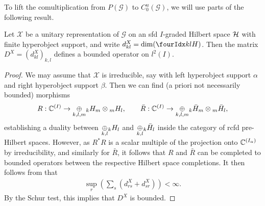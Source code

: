 To lift the comultiplication from $P(\mathscr{G})$ to
$C^{u}_{0}(\mathscr{G})$, we will use parts of the following result.


 \begin{Lem} \label{LemBoundDim} Let $\mathscr{X}$ be a unitary
   representation of $\mathscr{G}$ on an sfd $I$-graded Hilbert space $\Hsp$ with finite hyperobject support, and write $d^X_{kl} = \dim(\Gru{H}{k}{l})$. Then the matrix $D^X = (d^X_{kl})_{k,l}$ defines a bounded operator on $l^2(I)$. 
  \end{Lem}
  \begin{proof} We may assume that $\mathscr{X}$ is irreducible, say
    with left hyperobject support $\alpha$ and right hyperobject support
    $\beta$. Then we can find (a priori not necessarily bounded)
    morphisms \[R: \C^{(I)}\rightarrow \underset{k,l,m}{\oplus} \GrDA{H}{k}{m}\otimes
    \GrDA{H}{m}{l},\qquad \bar{R}: \C^{(I)} \rightarrow \underset{k,l,m}{\oplus}
    \GrDA{\bar{H}}{k}{m}\otimes \GrDA{\bar{H}}{m}{l},\] establishing a
    duality between $\underset{k,l}{\oplus} \GrDA{H}{k}{l}$ and
    $\underset{k,l}{\oplus}\GrDA{\bar{H}}{k}{l}$ inside the category of
    rcfd pre-Hilbert spaces. However, as $R^*R$ is a scalar multiple
    of the projection onto $\C^{(I_{\alpha})}$ by irreducibility, and
    similarly for $\bar{R}$, it follows that $R$ and $\bar{R}$ can be
    completed to bounded operators between the respective Hilbert
    space completions. It then follows from \cite[Lemma A.3.2]{DCY1}
    that 
    \begin{align} \label{eq:dim-estimate}
  \sup_r (\sum_s (d_{rs}^X+d_{sr}^X)) < \infty.    
    \end{align}
 By the Schur test,
    this implies that $D^X$ is bounded.
\end{proof} 



